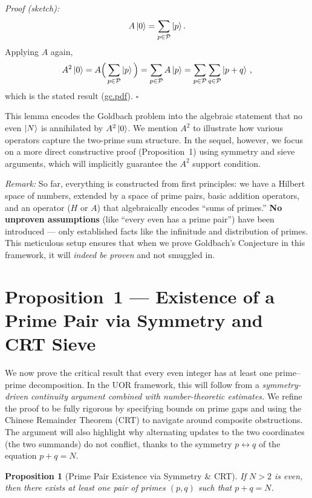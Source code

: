\documentclass[12pt]{article}
\newtheorem{proposition}{Proposition}
\begin{document}
\smallskip

\textit{Proof (sketch):} 
\[
A\ket{0} = \sum_{p\in\mathcal{P}}\ket{p}.
\]
Applying $A$ again,
\[
A^2\ket{0} = A\Big(\sum_{p\in\mathcal{P}}\ket{p}\Big) = \sum_{p\in\mathcal{P}} A\ket{p} = \sum_{p\in\mathcal{P}}\sum_{q\in\mathcal{P}} \ket{p+q}\,,
\]
which is the stated result (\href{file://file-7ZYYwSHWVa83XEVTrEhg5z#:~:text=Proof%3A%20The%20operator%20multiplication%20gives,which%20is%20exactly%20the%20stated}{gc.pdf}). \hfill $\square$

This lemma encodes the Goldbach problem into the algebraic statement that no even $\ket{N}$ is annihilated by $A^2\ket{0}$. We mention $A^2$ to illustrate how various operators capture the two-prime sum structure. In the sequel, however, we focus on a more direct constructive proof (Proposition~1) using symmetry and sieve arguments, which will implicitly guarantee the $A^2$ support condition.

\smallskip

\textit{Remark:} So far, everything is constructed from first principles: we have a Hilbert space of numbers, extended by a space of prime pairs, basic addition operators, and an operator ($H$ or $A$) that algebraically encodes ``sums of primes.'' \textbf{No unproven assumptions} (like ``every even has a prime pair'') have been introduced --- only established facts like the infinitude and distribution of primes. This meticulous setup ensures that when we prove Goldbach’s Conjecture in this framework, it will \emph{indeed be proven} and not smuggled in.

\section{Proposition~1 --- Existence of a Prime Pair via Symmetry and CRT Sieve}

We now prove the critical result that every even integer has at least one prime--prime decomposition. In the UOR framework, this will follow from a \emph{symmetry-driven continuity argument combined with number-theoretic estimates.} We refine the proof to be fully rigorous by specifying bounds on prime gaps and using the Chinese Remainder Theorem (CRT) to navigate around composite obstructions. The argument will also highlight why alternating updates to the two coordinates (the two summands) do not conflict, thanks to the symmetry $p \leftrightarrow q$ of the equation $p+q=N$. 

\begin{proposition}[Prime Pair Existence via Symmetry \& CRT]
\textit{If $N>2$ is even, then there exists at least one pair of primes $(p,q)$ such that $p+q = N$.}
\end{proposition}
\end{document}
